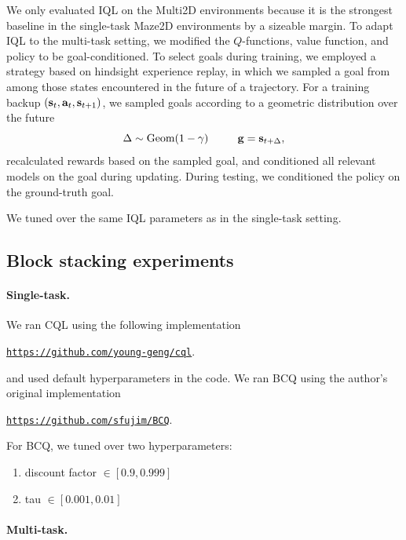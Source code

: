 \begin{appendices}
We only evaluated IQL on the Multi2D environments because it is the strongest baseline in the single-task Maze2D environments by a sizeable margin.
To adapt IQL to the multi-task setting, we modified the $Q$-functions, value function, and policy to be goal-conditioned.
To select goals during training, we employed a strategy based on hindsight experience replay, in which we sampled a goal from among those states encountered in the future of a trajectory.
For a training backup $(\mathbf{s}_t, \mathbf{a}_t, \mathbf{s}_{t+1})$, we sampled goals according to a geometric distribution over the future
\[
\Delta \sim \text{Geom}(1-\gamma) ~~~~~~~~ \mathbf{g} = \mathbf{s}_{t + \Delta},
\]
recalculated rewards based on the sampled goal, and conditioned all relevant models on the goal during updating.
During testing, we conditioned the policy on the ground-truth goal.

We tuned over the same IQL parameters as in the single-task setting.

\subsection{Block stacking experiments}

\paragraph{Single-task.}

We ran CQL using the following implementation
\begin{center}
{
    \small
    \href{https://github.com/young-geng/cql}
    {\texttt{https://github.com/young-geng/cql}}.
}
\end{center}
and used default hyperparameters in the code.
We ran BCQ using the author's original implementation
\begin{center}
{
    \small
    \href{https://github.com/sfujim/BCQ}
    {\texttt{https://github.com/sfujim/BCQ}}.
}
\end{center}

For BCQ, we tuned over two hyperparameters:
\begin{enumerate}
    \item discount factor $\in [0.9, 0.999]$
    \item tau $\in [0.001, 0.01]$
\end{enumerate}

\paragraph{Multi-task.}


\end{appendices}
